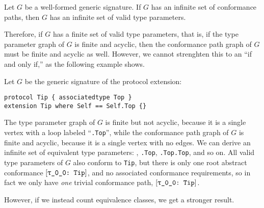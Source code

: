 \documentclass[../generics]{subfiles}
\begin{document}
\begin{proposition}
Let $G$ be a well-formed generic signature. If $G$ has an infinite set of conformance paths, then $G$ has an infinite set of valid type parameters.
\end{proposition}

Therefore, if $G$ has a finite set of valid type parameters, that is, if the type parameter graph of $G$ is finite and acyclic, then the conformance path graph of $G$ must be finite and acyclic as well. However, we cannot strenghten this to an ``if and only if,'' as the following example shows.

\begin{example}
Let $G$ be the generic signature of the protocol extension:
\begin{Verbatim}
protocol Tip { associatedtype Top }
extension Tip where Self == Self.Top {}
\end{Verbatim}
The type parameter graph of $G$ is finite but not acyclic, because it is a single vertex with a loop labeled ``\texttt{.Top}'', while the conformance path graph of $G$ is finite and acyclic, because it is a single vertex with no edges. We can derive an infinite set of equivalent type parameters: \rT, \texttt{\rT.Top}, \texttt{\rT.Top.Top}, and so on. All valid type parameters of $G$ also conform to \texttt{Tip}, but there is only one root abstract conformance $\ConfReq{\rT}{Tip}$, and no associated conformance requirements, so in fact we only have \emph{one} trivial conformance path, $\ConfReq{\rT}{Tip}$.
\end{example}

However, if we instead count equivalence classes, we get a stronger result.
\end{document}
